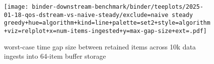 \begin{figure}
\texttt{[image: binder-downstream-benchmark/binder/teeplots/2025-01-18-qos-dstream-vs-naive-steady/exclude=naive steady greedy+hue=algorithm+kind=line+palette=set2+style=algorithm+viz=relplot+x=num-items-ingested+y=max-gap-size+ext=.pdf]}
\centering
\caption{worst-case time gap size between retained items across 10k data ingests into 64-item buffer storage}
\label{fig:perf-qos}
\end{figure}

